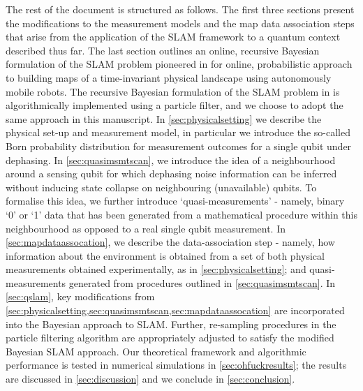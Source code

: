 The rest of the document is structured as follows. The first three sections present the modifications to the measurement models and the map data association steps that arise from the application of the SLAM framework to a quantum context described thus far. The last section outlines an online, recursive Bayesian formulation of the SLAM problem pioneered in \cite{thrun2001probabilistic} for online, probabilistic approach to building maps of a time-invariant physical landscape  using autonomously mobile robots. The recursive Bayesian formulation of the SLAM problem in \cite{thrun2001probabilistic} is algorithmically implemented using a particle filter, and we choose to adopt the same approach in this manuscript.  In \cref{sec:physicalsetting} we describe the physical set-up and measurement model, in particular we introduce the so-called Born probability distribution for measurement outcomes for a single qubit under dephasing. In \cref{sec:quasimsmtscan}, we introduce the idea of a neighbourhood around a sensing qubit for which dephasing noise information can be inferred without inducing state collapse on neighbouring (unavailable) qubits. To formalise this idea, we further introduce `quasi-measurements' - namely, binary `0' or `1' data that has been generated from a mathematical procedure within this neighbourhood as opposed to a real single qubit measurement. In \cref{sec:mapdataassocation}, we describe the data-association step - namely, how information about the environment is obtained from a set of both physical measurements obtained experimentally, as in \cref{sec:physicalsetting}; and quasi-measurements generated from procedures outlined in \cref{sec:quasimsmtscan}. In \cref{sec:qslam}, key modifications from \cref{sec:physicalsetting,sec:quasimsmtscan,sec:mapdataassocation} are incorporated into the Bayesian approach to SLAM. Further, re-sampling procedures in the particle filtering algorithm are appropriately adjusted to satisfy the modified Bayesian SLAM approach. Our theoretical framework and algorithmic performance is tested in numerical simulations in \cref{sec:ohfuckresults}; the results are discussed in \cref{sec:discussion} and we conclude in \cref{sec:conclusion}.
\\